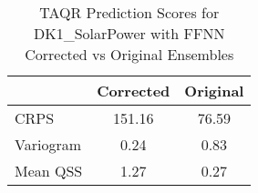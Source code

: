 
    \begin{table}[h!]
    \centering
    \begin{tabular}{|l|c|c|}
    \hline
    \textbf{} & \textbf{Corrected} & \textbf{Original} \\ \hline
    CRPS       & 151.16       & 76.59      \\ \hline
    Variogram  & 0.24  & 0.83 \\ \hline
    Mean QSS   & 1.27        & 0.27       \\ \hline
    \end{tabular}
    \caption{TAQR Prediction Scores for DK1_SolarPower with FFNN Corrected vs Original Ensembles}
    \label{tab:comparison}
    \end{table}
    